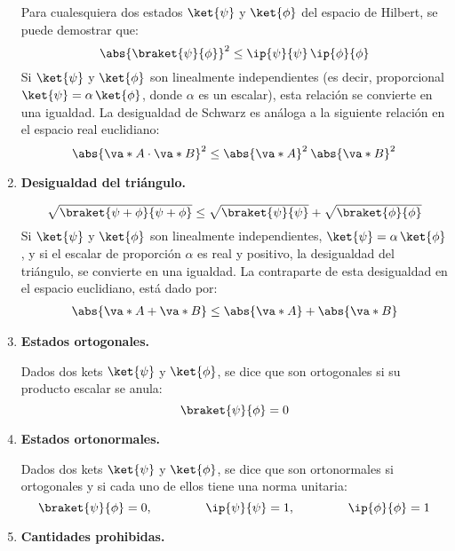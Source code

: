 \begin{enumerate}[label=\alph*)]
Para cualesquiera dos estados $\ket{\psi}$ y $\ket{\phi}$ del espacio de Hilbert, se puede demostrar que:
\begin{equation}
\abs{\braket{\psi}{\phi}}^{2} \leq \ip{\psi}{\psi} \, \ip{\phi}{\phi}
\label{eq:ecuacion_02_34}
\end{equation}
Si $\ket{\psi}$ y $\ket{\phi}$ son linealmente independientes (es decir, proporcional $\ket{\psi} = \alpha \, \ket{\phi}$, donde $\alpha$ es un escalar), esta relación se convierte en una igualdad. La desigualdad de Schwarz es análoga a la siguiente relación en el espacio real euclidiano:
\begin{equation}
\abs{\va*{A} \cdot \va*{B}}^{2} \leq \abs{\va*{A}}^{2} \: \abs{\va*{B}}^{2}
\label{eq:ecuacion_02_35}
\end{equation}
\item \textbf{Desigualdad del triángulo.}

\begin{equation}
\sqrt{\braket{\psi + \phi}{\psi + \phi}} \leq \sqrt{\braket{\psi}{\psi}} + \sqrt{\braket{\phi}{\phi}}
\label{eq:ecuacion_02_36}
\end{equation}
Si $\ket{\psi}$ y $\ket{\phi}$ son linealmente independientes, $\ket{\psi} = \alpha \, \ket{\phi}$, y si el escalar de proporción $\alpha$ es real y positivo, la desigualdad del triángulo, se convierte en una igualdad. La contraparte de esta desigualdad en el espacio euclidiano, está dado por:
\begin{align*}
\abs{\va*{A} +  \va*{B}} \leq \abs{\va*{A}} + \abs{\va*{B}}
\end{align*}
\item \textbf{Estados ortogonales.}

Dados dos kets $\ket{\psi}$ y $\ket{\phi}$, se dice que son ortogonales si su producto escalar se anula:
\begin{equation}
\braket{\psi}{\phi} = 0
\label{eq:ecuacion_02_37}
\end{equation}
\item \textbf{Estados ortonormales.}

Dados dos kets $\ket{\psi}$ y $\ket{\phi}$, se dice que son ortonormales si ortogonales y si cada uno de ellos tiene una norma unitaria:
\begin{equation}
\braket{\psi}{\phi} = 0, \hspace{1.5cm} \ip{\psi}{\psi} = 1, \hspace{1.5cm} \ip{\phi}{\phi} = 1
\label{eq:ecuacion_02_38}
\end{equation}
\item \textbf{Cantidades prohibidas.}


\end{enumerate}
